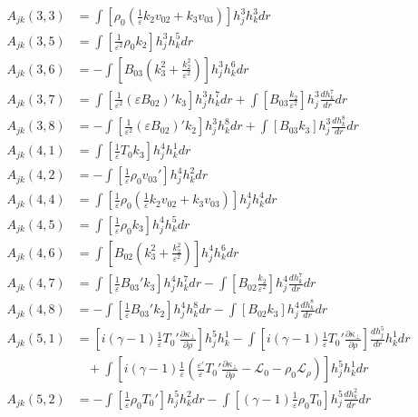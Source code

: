 \documentclass[11pt, fleqn]{article}
\newcommand{\HL}{\mathscr{L}}
\newcommand{\eps}{\varepsilon}
\begin{document}
\begin{align*}
	A_{jk}(3, 3) &=  \int \left[\rho_0\left(\frac{1}{\eps}k_2v_{02} + k_3v_{03}\right)\right] h_j^3 h_k^3 dr											\\
	A_{jk}(3, 5) &=  \int \left[\frac{1}{\eps^2}\rho_0k_2\right] h_j^3 h_k^5 dr																			\\
	A_{jk}(3, 6) &= -\int \left[B_{03}\left(k_3^2 + \frac{k_2^2}{\eps^2}\right)\right]h_j^3 h_k^6 dr													\\
	A_{jk}(3, 7) &=  \int \left[\frac{1}{\eps^2}(\eps B_{02})'k_3\right] h_j^3 h_k^7 dr  +  \int \left[ B_{03}\frac{k_2}{\eps^2}\right] h_j^3 \frac{dh_k^7}{dr} dr	\\
	A_{jk}(3, 8) &= -\int \left[\frac{1}{\eps^2}(\eps B_{02})'k_2\right] h_j^3 h_k^8 dr  +  \int \left[ B_{03}k_3\right]h_j^3 \frac{dh_k^8}{dr} dr		\\
	A_{jk}(4, 1) &=  \int \left[\frac{1}{\eps}T_0k_3\right] h_j^4 h_k^1 dr																				\\
	A_{jk}(4, 2) &= -\int \left[\frac{1}{\eps}\rho_0v_{03}'\right] h_j^4 h_k^2 dr																		\\
	A_{jk}(4, 4) &=  \int \left[\frac{1}{\eps}\rho_0\left(\frac{1}{\eps}k_2v_{02} + k_3v_{03}\right)\right] h_j^4 h_k^4 dr								\\
	A_{jk}(4, 5) &=  \int \left[\frac{1}{\eps}\rho_0k_3\right] h_j^4 h_k^5 dr																			\\
	A_{jk}(4, 6) &=  \int \left[B_{02}\left(k_3^2 + \frac{k_2^2}{\eps^2}\right)\right] h_j^4 h_k^6 dr													\\
	A_{jk}(4, 7) &=  \int \left[\frac{1}{\eps}B_{03}'k_3\right] h_j^4 h_k^7 dr - \int \left[B_{02}\frac{k_2}{\eps^2}\right] h_j^4 \frac{dh_k^7}{dr}dr   \\
	A_{jk}(4, 8) &= -\int \left[\frac{1}{\eps}B_{03}'k_2\right] h_j^4 h_k^8 dr - \int \left[B_{02}k_3\right] h_j^4 \frac{dh_k^8}{dr} dr					\\
	A_{jk}(5, 1) &=  \left[i(\gamma - 1)\frac{1}{\eps}T_0'\frac{\partial \kappa_\bot}{\partial \rho}\right] h_j^5 h_k^1 - \int \left[i(\gamma - 1)\frac{1}{\eps}T_0'\frac{\partial \kappa_\bot}{\partial \rho}\right] \frac{dh_j^5}{dr} h_k^1 dr		\\
				 &~~~~ +\int \left[i(\gamma - 1)\frac{1}{\eps}\left(\frac{\eps'}{\eps}T_0'\frac{\partial \kappa_\bot}{\partial \rho} - \HL_0 - \rho_0\HL_\rho\right)\right] h_j^5h_k^1 dr																\\
	A_{jk}(5, 2) &= -\int \left[\frac{1}{\eps}\rho_0T_0'\right] h_j^5h_k^2 dr - \int \left[(\gamma - 1)\frac{1}{\eps}\rho_0T_0\right] h_j^5\frac{dh_k^2}{dr} dr	\\

\end{align*}
\end{document}
